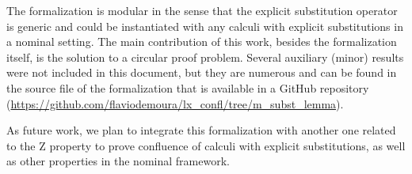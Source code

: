 The formalization is modular in the sense that the explicit substitution operator is generic and could be instantiated with any calculi with  explicit substitutions in a nominal setting. The main contribution of this work, besides the formalization itself, is the solution to a circular proof problem. Several auxiliary (minor) results were not included in this document, but they are numerous and can be found in the source file of the formalization that is available in a GitHub repository (\url{https://github.com/flaviodemoura/lx_confl/tree/m_subst_lemma}).


As future work, we plan to integrate this formalization with another one related to the Z property \cite{fmm2021} to prove confluence  of calculi with explicit substitutions\cite{nakazawaCompositionalConfluenceProofs2016,nakazawaCallbyvalue2017}, as well as  other properties in the nominal framework\cite{kesnerPerpetualityFullSafe2008}. 
\begin{coqdoccode}
\end{coqdoccode}
